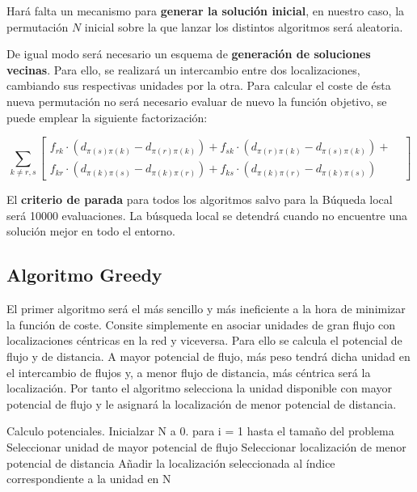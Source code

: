 \documentclass[10pt,a4paper]{article}
\begin{document}
Hará falta un mecanismo para \textbf{generar la solución inicial}, en nuestro caso, la permutación $N$ inicial sobre la que lanzar los distintos algoritmos será aleatoria.

De igual modo será necesario un esquema de \textbf{generación de soluciones vecinas}. Para ello, se realizará un intercambio entre dos localizaciones, cambiando sus respectivas unidades por la otra. Para calcular el coste de ésta nueva permutación no será necesario evaluar de nuevo la función objetivo, se puede emplear la siguiente factorización:

\begin{displaymath}
    \sum_{k \neq r,s} 
\begin{bmatrix}
 f_{rk}\cdot (d_{\pi (s)\pi(k)} -  d_{\pi (r)\pi(k)}) 
+ f_{sk}\cdot (d_{\pi (r)\pi(k)} -  d_{\pi (s)\pi(k)}) +  & \\ 
f_{kr}\cdot (d_{\pi (k)\pi(s)} -  d_{\pi (k)\pi(r)})  +
f_{ks}\cdot (d_{\pi (k)\pi(r)} -  d_{\pi (k)\pi(s)})  & 
\end{bmatrix}
\end{displaymath}

El \textbf{criterio de parada} para todos los algoritmos salvo para la Búqueda local será 10000 evaluaciones. La búsqueda local se detendrá cuando no encuentre una solución mejor en todo el entorno.

\subsection{Algoritmo Greedy}

El primer algoritmo será el más sencillo y más ineficiente a la hora de minimizar la función de coste. Consite simplemente en asociar unidades de gran flujo con localizaciones céntricas en la red y viceversa. Para ello se calcula el potencial de flujo y de distancia. A mayor potencial de flujo, más peso tendrá dicha unidad en el intercambio de flujos y, a menor flujo de distancia, más céntrica será la localización. Por tanto el algoritmo selecciona la unidad disponible con mayor potencial de flujo y le asignará la localización de menor potencial de distancia.

\begin{ccode}
    Calculo potenciales.
    Inicialzar N a 0.
    para i = 1 hasta el tamaño del problema
        Seleccionar unidad de mayor potencial de flujo
        Seleccionar localización de menor potencial de distancia
        Añadir la localización seleccionada al índice correspondiente a la unidad en N
\end{ccode}
\end{document}
